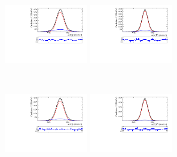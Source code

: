 \begin{figure}[!h]
   \centering
   \begin{subfigure}[t]{1.0\textwidth}
      \centering
      \includegraphics[width=0.40\textwidth]{figs/B2DsPhi/Plot_Signal_Fit_All_B2PhiDs_Ds2KKPi.pdf}
      \includegraphics[width=0.40\textwidth]{figs/B2DsPhi/Plot_Signal_Fit_All_B2D0Ds_Ds2KKPi.pdf}
   \caption{\decay{\Dsp}{\Kp\Km\pip}}
   \end{subfigure}\\
   \begin{subfigure}[t]{1.0\textwidth}
      \centering
      \includegraphics[width=0.40\textwidth]{figs/B2DsPhi/Plot_Signal_Fit_All_B2PhiDs_Ds2PiPiPi.pdf}
      \includegraphics[width=0.40\textwidth]{figs/B2DsPhi/Plot_Signal_Fit_All_B2D0Ds_Ds2PiPiPi.pdf}
      \caption{\decay{\Dsp}{\pip\pim\pip}}
   \end{subfigure}\\

\end{figure}
